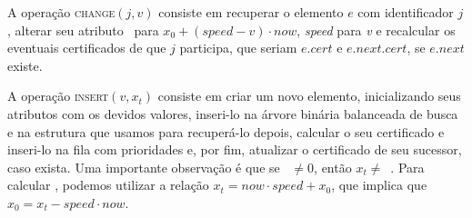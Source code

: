 






A operação \textsc{change}$(j, v)$ consiste em recuperar o
elemento $e$ com identificador $j$, alterar seu atributo
\initv~para $x_0 + (\mathit{speed} - v)\cdot now$,
\textit{speed} para \textit{v} e recalcular os eventuais
certificados de que $j$ participa, que seriam $e.cert$ e
$e.next.cert$, se $e.next$ existe.







A operação \textsc{insert}$(v, x_t)$ consiste em criar um novo
elemento, inicializando seus atributos com os devidos valores,
inseri-lo na árvore binária balanceada de busca e na estrutura que
usamos para recuperá-lo depois, calcular o seu certificado e
inseri-lo na fila com prioridades e, por fim, atualizar o
certificado de seu sucessor, caso exista. Uma importante observação
é que se \now~$\neq 0$, então $x_t \neq$~\initv. Para calcular
\initv, podemos utilizar a relação $x_t = now\cdot speed + x_0$, que
implica que $x_0 = x_t - speed\cdot now$.

